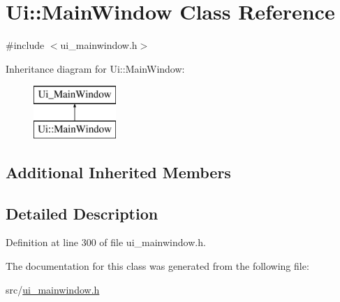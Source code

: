 \hypertarget{class_ui_1_1_main_window}{}\section{Ui\+::Main\+Window Class Reference}
\label{class_ui_1_1_main_window}


{\ttfamily \#include $<$ui\+\_\+mainwindow.\+h$>$}

Inheritance diagram for Ui\+::Main\+Window\+:\begin{figure}[H]
\begin{center}
\leavevmode
\includegraphics[height=2.000000cm]{class_ui_1_1_main_window}
\end{center}
\end{figure}
\subsection*{Additional Inherited Members}


\subsection{Detailed Description}


Definition at line 300 of file ui\+\_\+mainwindow.\+h.



The documentation for this class was generated from the following file\+:\begin{DoxyCompactItemize}
\item 
src/\mbox{\hyperlink{ui__mainwindow_8h}{ui\+\_\+mainwindow.\+h}}\end{DoxyCompactItemize}
